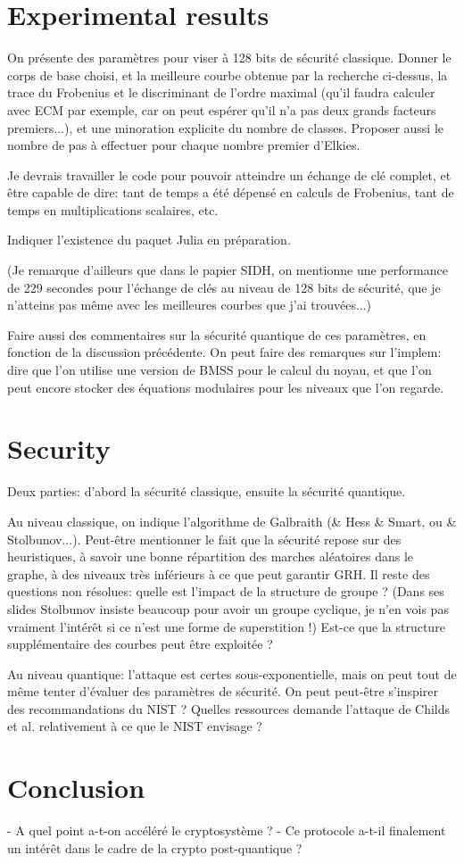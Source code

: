 \documentclass{article}
\begin{document}
\section{Experimental results}

On présente des paramètres pour viser à 128 bits de sécurité
classique.  Donner le corps de base choisi, et la meilleure courbe
obtenue par la recherche ci-dessus, la trace du Frobenius et le
discriminant de l'ordre maximal (qu'il faudra calculer avec ECM par
exemple, car on peut espérer qu'il n'a pas deux grands facteurs
premiers...), et une minoration explicite du nombre de classes.
Proposer aussi le nombre de pas à effectuer pour chaque nombre premier
d'Elkies.

Je devrais travailler le code pour pouvoir atteindre un échange de clé
complet, et être capable de dire: tant de temps a été dépensé en
calculs de Frobenius, tant de temps en multiplications scalaires, etc.

Indiquer l'existence du paquet Julia en préparation.

(Je remarque d'ailleurs que dans le papier SIDH, on mentionne une
performance de 229 secondes pour l'échange de clés au niveau de 128
bits de sécurité, que je n'atteins pas même avec les meilleures
courbes que j'ai trouvées...)

Faire aussi des commentaires sur la sécurité quantique de ces
paramètres, en fonction de la discussion précédente.  On peut faire
des remarques sur l'implem: dire que l'on utilise une version de BMSS
pour le calcul du noyau, et que l'on peut encore stocker des équations
modulaires pour les niveaux que l'on regarde.

\section{Security}

Deux parties: d'abord la sécurité classique, ensuite la sécurité quantique.

Au niveau classique, on indique l'algorithme de Galbraith (\& Hess \&
Smart, ou \& Stolbunov...). Peut-être mentionner le fait que la
sécurité repose sur des heuristiques, à savoir une bonne répartition
des marches aléatoires dans le graphe, à des niveaux très inférieurs à
ce que peut garantir GRH.  Il reste des questions non résolues: quelle
est l'impact de la structure de groupe ? (Dans ses slides Stolbunov
insiste beaucoup pour avoir un groupe cyclique, je n'en vois pas
vraiment l'intérêt si ce n'est une forme de superstition !)  Est-ce
que la structure supplémentaire des courbes peut être exploitée ?

Au niveau quantique: l'attaque est certes sous-exponentielle, mais on
peut tout de même tenter d'évaluer des paramètres de sécurité. On peut
peut-être s'inspirer des recommandations du NIST ? Quelles ressources
demande l'attaque de Childs et al. relativement à ce que le NIST
envisage ?


\section{Conclusion}

- A quel point a-t-on accéléré le cryptosystème ?
- Ce protocole a-t-il finalement un intérêt dans le cadre de la crypto post-quantique ?
\end{document}
